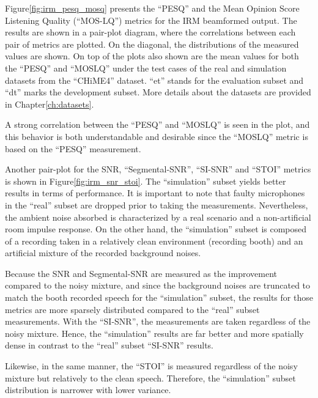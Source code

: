 Figure\;\ref{fig:irm_pesq_mosq} presents the ``PESQ'' and 
the Mean Opinion Score Listening Quality (``MOS-LQ'') 
metrics for the IRM beamformed output. The results are shown in a pair-plot
diagram, where the correlations between each pair of metrics are plotted.
On the diagonal, the distributions of the measured values are shown.
On top of the plots also shown are the mean values for both 
the ``PESQ'' and ``MOSLQ'' under the test cases of the real and 
simulation datasets from the ``CHiME4'' dataset. ``et'' stands for
the evaluation subset and ``dt'' marks the development subset.
More details about the datasets are provided in Chapter\;\ref{ch:datasets}.

A strong correlation between the ``PESQ'' and ``MOSLQ'' is seen in the
plot, and this behavior is both understandable and desirable since
the ``MOSLQ'' metric is based on the ``PESQ'' measurement.

Another pair-plot for the SNR, ``Segmental-SNR'', ``SI-SNR'' and ``STOI''
metrics is shown in Figure\;\ref{fig:irm_snr_stoi}.
The ``simulation'' subset yields better results in terms of
performance. It is important to note that faulty microphones
in the ``real'' subset are dropped prior to taking the measurements.
Nevertheless, the ambient noise absorbed is characterized by
a real scenario and a non-artificial room impulse response. On the other hand,
the ``simulation'' subset is composed of a recording taken in a relatively
clean environment (recording booth) and an artificial mixture of
the recorded background noises.

Because the SNR and Segmental-SNR are measured as the improvement
compared to the noisy mixture, 
and since the background noises are truncated 
to match the booth recorded speech for the ``simulation'' subset, 
the results for those metrics are more sparsely distributed 
compared to the ``real'' subset measurements. 
With the ``SI-SNR'', 
the measurements are taken regardless of the noisy mixture. 
Hence, the ``simulation'' results are far better 
and more spatially dense 
in contrast to the ``real'' subset ``SI-SNR'' results.

Likewise, in the same manner, 
the ``STOI'' is measured regardless of the noisy mixture
but relatively to the clean speech. 
Therefore, the ``simulation'' 
subset distribution is narrower with lower variance.


